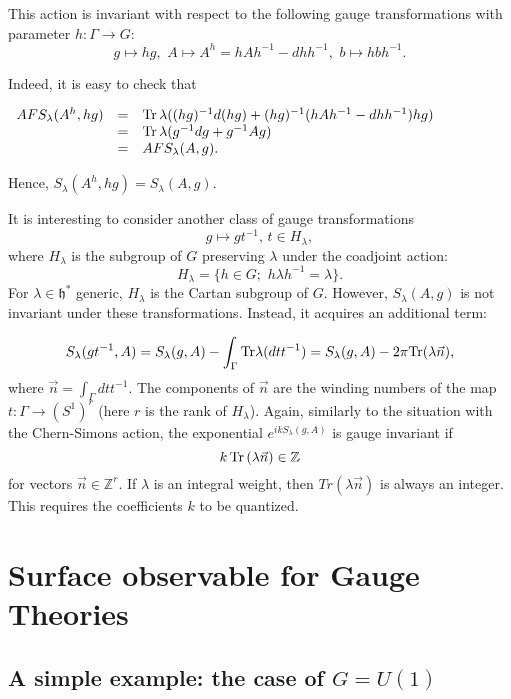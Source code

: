 \documentclass[11pt]{report}
\theoremstyle{plain}
\theoremstyle{definition}
\theoremstyle{remark}
\theoremstyle{remark}
\numberwithin{equation}{section}
\begin{document}
This action is invariant with respect to the following gauge transformations with parameter $h: \Gamma \to G$:
$$ g \mapsto hg, \,\, A \mapsto A^h=hAh^{-1} - dhh^{-1}, \,\, b \mapsto hbh^{-1}.$$

Indeed, it is easy to check that  
%
\begin{spacing}{1.45}
$
\begin{array}{lll}
AFS_\lambda (A^h, hg) & = &  {\rm Tr} \, \lambda((hg)^{-1} d(hg) + (hg)^{-1} (hAh^{-1} - dhh^{-1}) hg) \\
& = & {\rm Tr} \, \lambda(g^{-1} dg + g^{-1} A g)\\
& = & AFS_\lambda(A,g).
\end{array}
$
\end{spacing}

Hence,  $S_\lambda (A^h, hg) = S_\lambda(A,g)$.

It is interesting to consider another class of gauge transformations
%
$$ g \mapsto gt^{-1}, \, t \in H_\lambda,  
$$
where $H_\lambda$ is the subgroup of $G$ preserving $\lambda$ under the coadjoint action:
%
$$
H_\lambda = \{ h \in G; \,\, h \lambda h^{-1} =\lambda \} .
$$
For $\lambda \in \mathfrak{h}^*$ generic, $H_\lambda$ is the Cartan subgroup of $G$.
However, $S_\lambda(A,g)$  is not invariant under these transformations. 
Instead, it acquires an additional term:

\begin{equation} 
S_\lambda(gt^{-1}, A)  =  S_\lambda(g, A) - \int_{\Gamma} {\rm Tr}\lambda(dtt^{-1}) =  S_\lambda(g, A)  - 2 \pi {\rm Tr}(\lambda \vec{n}),
\end{equation}
where $\vec{n}=\int_\Gamma dtt^{-1}$. The components of $\vec{n}$ are the winding numbers of the map $t: \Gamma \to (S^1)^r$
(here $r$ is the rank of $H_\lambda$).
Again, similarly to the situation with the Chern-Simons action, the exponential $e^{ikS_\lambda(g, A)}$ is gauge invariant if 
%
$$
k\, {\rm Tr} \, (\lambda \vec{n}) \in \mathbb{Z} 
$$
for vectors $\vec{n}\in \mathbb{Z}^r$.
If $\lambda$ is an integral weight, then $Tr(\lambda \vec{n})$ is always an integer. This requires the coefficients $k$ to be quantized.






\chapter{Surface observable for Gauge Theories}\label{research}

\section{A simple example: the case of $G=U(1)$}\label{2}
\end{document}
